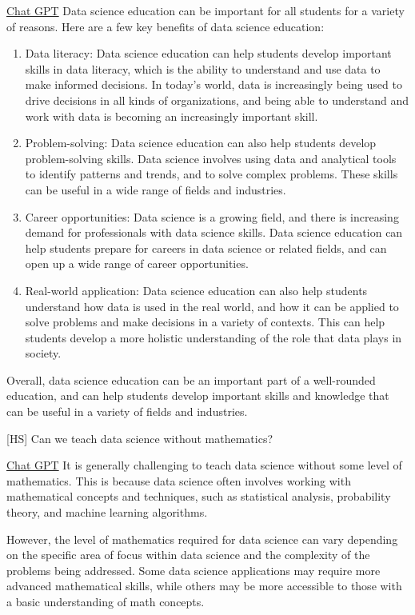 \documentclass[
]{book}
\providecommand{\tightlist}{%
  \setlength{\itemsep}{0pt}\setlength{\parskip}{0pt}}
\theoremstyle{definition}
\theoremstyle{definition}
\theoremstyle{definition}
\theoremstyle{definition}
\theoremstyle{remark}
\begin{document}
\protect\hyperlink{chatgpt}{Chat GPT} Data science education can be important for all students for a variety of reasons. Here are a few key benefits of data science education:

\begin{enumerate}
\def\labelenumi{\arabic{enumi}.}
\tightlist
\item
  Data literacy: Data science education can help students develop important skills in data literacy, which is the ability to understand and use data to make informed decisions. In today's world, data is increasingly being used to drive decisions in all kinds of organizations, and being able to understand and work with data is becoming an increasingly important skill.
\item
  Problem-solving: Data science education can also help students develop problem-solving skills. Data science involves using data and analytical tools to identify patterns and trends, and to solve complex problems. These skills can be useful in a wide range of fields and industries.
\item
  Career opportunities: Data science is a growing field, and there is increasing demand for professionals with data science skills. Data science education can help students prepare for careers in data science or related fields, and can open up a wide range of career opportunities.
\item
  Real-world application: Data science education can also help students understand how data is used in the real world, and how it can be applied to solve problems and make decisions in a variety of contexts. This can help students develop a more holistic understanding of the role that data plays in society.
\end{enumerate}

Overall, data science education can be an important part of a well-rounded education, and can help students develop important skills and knowledge that can be useful in a variety of fields and industries.

{[}HS{]} Can we teach data science without mathematics?

\protect\hyperlink{chatgpt}{Chat GPT} It is generally challenging to teach data science without some level of mathematics. This is because data science often involves working with mathematical concepts and techniques, such as statistical analysis, probability theory, and machine learning algorithms.

However, the level of mathematics required for data science can vary depending on the specific area of focus within data science and the complexity of the problems being addressed. Some data science applications may require more advanced mathematical skills, while others may be more accessible to those with a basic understanding of math concepts.
\end{document}
